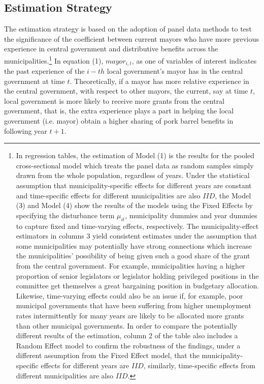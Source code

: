 \subsection*{Estimation Strategy}
The estimation strategy is based on the adoption of panel data methods to test the significance of the coefficient between current mayors who have more previous experience in central government and distributive benefits across the municipalities.\footnote{In regression tables, the estimation of Model (1) is the results for the pooled cross-sectional model which treats the panel data as random samples simply drawn from the whole population, regardless of years. Under the statistical assumption that municipality-specific effects for different years are constant and time-specific effects for different municipalities are also $IID$, the Model (3) and Model (4) show the results of the models using the Fixed Effects by specifying the disturbance term $ \mu_{it}$, municipality dummies and year dummies to capture fixed and time-varying effects, respectively. The municipality-effect estimators in columns 3 yield consistent estimates under the assumption that some municipalities may potentially have strong connections which increase the municipalities' possibility of being given such a good share of the grant from the central government. For example, municipalities having a higher proportion of senior legislators or legislator holding privileged positions in the committee get themselves a great bargaining position in budgetary allocation. Likewise, time-varying effects could also be an issue if, for example, poor municipal governments that have been suffering from higher unemployment rates intermittently for many years are likely to be allocated more grants than other municipal governments. In order to compare the potentially different results of the estimation, column 2 of the table also includes a Random Effect model to confirm the robustness of the findings, under a different assumption from the Fixed Effect model, that the municipality-specific effects for different years are $IID$, similarly, time-specific effects from different municipalities are also $IID$.} In equation (1), $mayor_{i,t}$, as one of variables of interest indicates the past experience of the $i-th$ local government's mayor has in the central government at time $t$. Theoretically, if a mayor has more relative experience in the central government, with respect to other mayors, the current, say at time $t$, local government is more likely to receive more grants from the central government, that is, the extra experience plays a part in helping the local government (i.e. mayor) obtain a higher sharing of pork barrel benefits in following year ${t+1}$. 

